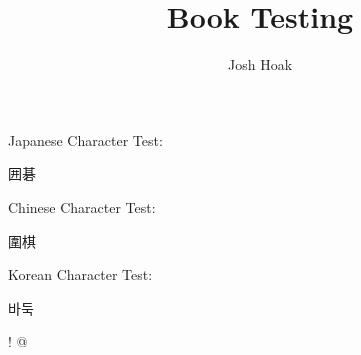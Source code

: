 \documentclass{book}
\newenvironment{Korean}{\CJKfamily{mj}}{}
\begin{document}
\title{Book Testing}
\author{Josh Hoak}
\maketitle

Japanese Character Test:
\begin{CJK}{UTF8}{min}
囲碁
\end{CJK}

Chinese Character Test:
\begin{CJK}{UTF8}{min}
圍棋
\end{CJK}

Korean Character Test:
\begin{CJK}{UTF8}{}
\begin{Korean}
바둑
\end{Korean}
\end{CJK}

{\gooegb ! @}




\end{document}
